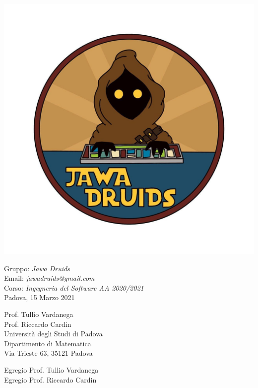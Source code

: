 \documentclass[a4paper,12pt]{report}
\begin{document}
\mbox{}
\vspace{-4cm}
\begin{center}
  \includegraphics[width=0.6\linewidth]{immagini/DRUIDSLOGO.jpg}
\end{center}
Gruppo: \textit{Jawa Druids} \\ Email: \textit{jawadruids@gmail.com}\\ Corso: \textit{Ingegneria del Software AA 2020/2021}\\Padova, 15 Marzo 2021 \\
\begin{flushright}
  Prof. Tullio Vardanega \\
  Prof. Riccardo Cardin \\
  Università degli Studi di Padova \\
  Dipartimento di Matematica \\
  Via Trieste 63, 35121 Padova \\
\end{flushright}
Egregio Prof. Tullio Vardanega \\
Egregio Prof. Riccardo Cardin \\
\vspace{0.2cm}
\end{document}
